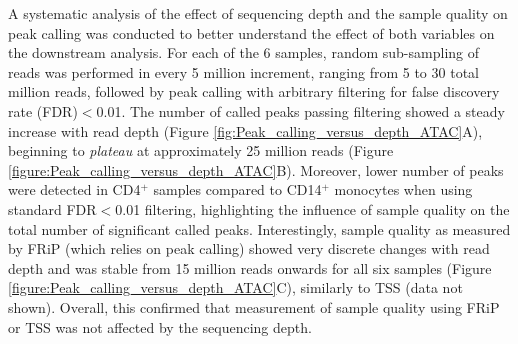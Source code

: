 A systematic analysis of the effect of sequencing depth and the sample quality on peak calling was conducted to better understand the effect of both variables on the downstream analysis. For each of the 6 samples, random sub-sampling of reads was performed in every 5 million increment, ranging from 5 to 30 total million reads, followed by peak calling with arbitrary filtering for false discovery rate (FDR)$<$0.01. The number of called peaks passing filtering showed a steady increase with read depth  (Figure \ref{fig:Peak_calling_versus_depth_ATAC}A), beginning to \textit{plateau} at approximately 25 million reads (Figure \ref{figure:Peak_calling_versus_depth_ATAC}B). Moreover, lower number of peaks were detected in CD4$^+$ samples compared to CD14$^+$ monocytes when using standard  FDR$<$0.01 filtering, highlighting the influence of sample quality on the total number of significant called peaks. Interestingly, sample quality as measured by FRiP (which relies on peak calling) showed very discrete changes with read depth and was stable from 15 million reads onwards for all six samples (Figure \ref{figure:Peak_calling_versus_depth_ATAC}C), similarly to TSS (data not shown). Overall, this confirmed that measurement of sample quality using FRiP or TSS was not affected by the sequencing depth.


